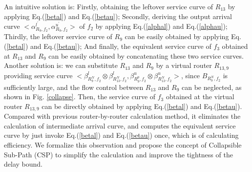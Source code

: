 \documentclass[10pt,journal]{IEEEtran}
\begin{document}
An intuitive solution is: Firstly, obtaining the leftover service curve of $R_{13}$ by applying Eq.(\ref{betal}) and Eq.(\ref{betau}); Secondly, deriving the output arrival curve $<\alpha_{R_{9},f_2}^{l^\prime},\alpha_{R_{9},f_2}^{u^\prime}>$ of $f_2$ by applying Eq.(\ref{alphal}) and Eq.(\ref{alphau}); Thirdly, the leftover service curve of $R_9$ can be easily obtained by applying Eq.(\ref{betal}) and Eq.(\ref{betau}); And finally, the equivalent service curve of $f_3$ obtained at $R_{13}$ and $R_9$ can be easily obtained by concatenating these two service curves. Another solution is: we can substitute $R_{13}$ and $R_{9}$ by a virtual router $R_{13,9}$ providing service curve $<\beta_{R_{9}^N,f_2}^l\otimes\beta_{R_{13}^N,f_2}^l,\beta_{R_{9}^{p},f_2}^u\otimes\beta_{R_{13}^N,f_2}^u>$, since $B_{R_9^N,f_2}$ is sufficiently large, and the flow control between $R_{13}$ and $R_9$ can be neglected, as shown in Fig. \ref{collapse}. Then, the service curve of $f_3$ obtained at the virtual router $R_{13,9}$ can be directly obtained by applying Eq.(\ref{betal}) and Eq.(\ref{betau}). Compared with previous router-by-router calculation method, it eliminates the calculation of intermediate arrival curve, and computes the equivalent service curve by just invoke Eq.(\ref{betal}) and Eq.(\ref{betau}) once, which is of calculating efficiency. We formalize this observation and propose the concept of Collapsible Sub-Path (CSP) to simplify the calculation and improve the tightness of the delay bound.
\end{document}
